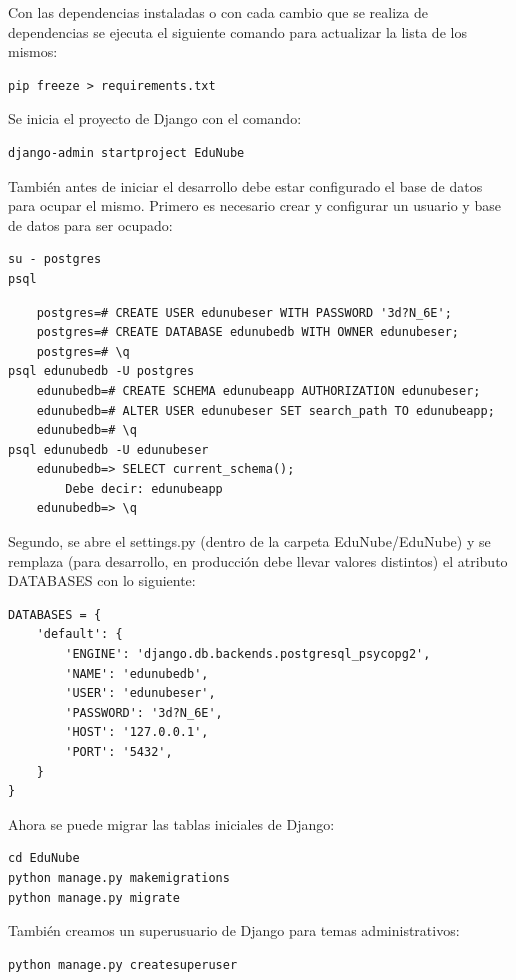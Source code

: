Con las dependencias instaladas o con cada cambio que se realiza de dependencias se ejecuta el siguiente comando para actualizar la lista de los mismos:

\begin{lstlisting}
pip freeze > requirements.txt
\end{lstlisting}

Se inicia el proyecto de Django con el comando:

\begin{lstlisting}
django-admin startproject EduNube
\end{lstlisting}

También antes de iniciar el desarrollo debe estar configurado el base de datos para ocupar el mismo. Primero es necesario crear y configurar un usuario y base de datos para ser ocupado:

\begin{lstlisting}
su - postgres
psql
\end{lstlisting}
\begin{lstlisting}
	postgres=# CREATE USER edunubeser WITH PASSWORD '3d?N_6E';
	postgres=# CREATE DATABASE edunubedb WITH OWNER edunubeser;
	postgres=# \q
psql edunubedb -U postgres
	edunubedb=# CREATE SCHEMA edunubeapp AUTHORIZATION edunubeser;
	edunubedb=# ALTER USER edunubeser SET search_path TO edunubeapp;
	edunubedb=# \q
psql edunubedb -U edunubeser
	edunubedb=> SELECT current_schema();
		Debe decir: edunubeapp
	edunubedb=> \q
\end{lstlisting}

Segundo, se abre el settings.py (dentro de la carpeta EduNube/EduNube) y se remplaza (para desarrollo, en producción debe llevar valores distintos) el atributo DATABASES con lo siguiente:
\lstset{language=Python}
\begin{lstlisting}
DATABASES = {
    'default': {
        'ENGINE': 'django.db.backends.postgresql_psycopg2',
        'NAME': 'edunubedb',
        'USER': 'edunubeser',
        'PASSWORD': '3d?N_6E',
        'HOST': '127.0.0.1',
        'PORT': '5432',
    }
}
\end{lstlisting}
\lstset{language=Bash}

Ahora se puede migrar las tablas iniciales de Django:
\begin{lstlisting}
cd EduNube
python manage.py makemigrations
python manage.py migrate
\end{lstlisting}

También creamos un superusuario de Django para temas administrativos:
\begin{lstlisting}
python manage.py createsuperuser
\end{lstlisting}

